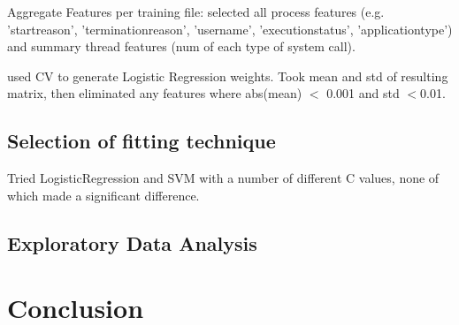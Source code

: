 \documentclass[11pt, oneside]{article}   	%
\begin{document}
Aggregate Features per training file:
 selected all process features  (e.g. 'startreason', 'terminationreason', 'username', 'executionstatus', 'applicationtype') and summary thread features (num of each type of system call).

used CV to generate Logistic Regression weights. Took mean and std of resulting matrix, then eliminated any features where abs(mean) $<$ 0.001 and std $< $0.01.



\subsection*{Selection of fitting technique}

Tried LogisticRegression and SVM with a number of different C values, none of which made a significant difference.

\subsection*{Exploratory Data Analysis}

\section*{Conclusion}
\end{document}
